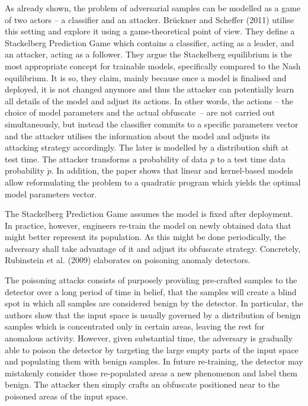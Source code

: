 \documentclass[10pt]{article}
\begin{document}
As already shown, the problem of adversarial samples can be modelled as
a game of two actors – a classifier and an attacker. Brückner and
Scheffer (2011) utilise this setting and explore it using a
game-theoretical point of view. They define a Stackelberg Prediction
Game which contains a classifier, acting as a leader, and an attacker,
acting as a follower. They argue the Stackelberg equilibrium is the most
appropriate concept for trainable models, specifically compared to the
Nash equilibrium. It is so, they claim, mainly because once a model is
finalised and deployed, it is not changed anymore and thus the attacker
can potentially learn all details of the model and adjust its actions.
In other words, the actions – the choice of model parameters and the
actual obfuscate~– are not carried out simultaneously, but instead the
classifier commits to a specific parameters vector and the attacker
utilises the information about the model and adjusts its attacking
strategy accordingly. The later is modelled by a distribution shift at
test time. The attacker transforms a probability of data \(p\) to a test
time data probability \(\dot{p}\). In addition, the paper shows that
linear and kernel-based models allow reformulating the problem to a
quadratic program which yields the optimal model parameters vector.

The Stackelberg Prediction Game assumes the model is fixed after
deployment. In practice, however, engineers re-train the model on newly
obtained data that might better represent its population. As this might
be done periodically, the adversary shall take advantage of it and
adjust its obfuscate strategy. Concretely, Rubinstein et al. (2009)
elaborates on poisoning anomaly detectors.

The poisoning attacks consists of purposely providing pre-crafted
samples to the detector over a long period of time in belief, that the
samples will create a blind spot in which all samples are considered
benign by the detector. In particular, the authors show that the input
space is usually governed by a distribution of benign samples which is
concentrated only in certain areas, leaving the rest for anomalous
activity. However, given substantial time, the adversary is gradually
able to poison the detector by targeting the large empty parts of the
input space and populating them with benign samples. In future
re-training, the detector may mistakenly consider those re-populated
areas a new phenomenon and label them benign. The attacker then simply
crafts an obfuscate positioned near to the poisoned areas of the input
space.
\end{document}

